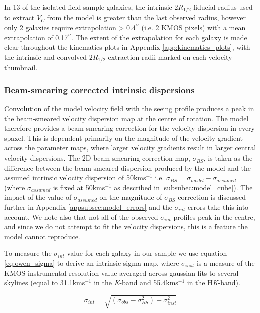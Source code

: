\documentclass[fleqn,usenatbib]{mn2e}
\begin{document}
In 13 of the isolated field sample galaxies, the intrinsic $2R_{1/2}$ fiducial radius used to extract $V_{C}$ from the model is greater than the last observed radius, however only 2 galaxies require extrapolation > 0.4$^{\prime\prime}$ (i.e. 2 KMOS pixels) with a mean extrapolation of 0.17$^{\prime\prime}$.
The extent of the extrapolation for each galaxy is made clear throughout the kinematics plots in Appendix \ref{app:kinematics_plots}, with the intrinsic and convolved $2R_{1/2}$ extraction radii marked on each velocity thumbnail.

\subsubsection{Beam-smearing corrected intrinsic dispersions}\label{subsubsec:beam_smearing_corrected_dispersions}
Convolution of the model velocity field with the seeing profile produces a peak in the beam-smeared velocity dispersion map at the centre of rotation.
The model therefore provides a beam-smearing correction for the velocity dispersion in every spaxel.
This is dependent primarily on the magnitude of the velocity gradient across the parameter maps, where larger velocity gradients result in larger central velocity dispersions.
The 2D beam-smearing correction map, $\sigma_{BS}$, is taken as the difference between the beam-smeared dispersion produced by the model and the assumed intrinsic velocity dispersion of 50kms$^{-1}$ i.e. $\sigma_{BS} = \sigma_{model} - \sigma_{assumed}$ (where $\sigma_{assumed}$ is fixed at 50kms$^{-1}$ as described in \cref{subsubec:model_cube}).
The impact of the value of $\sigma_{assumed}$ on the magnitude of $\sigma_{BS}$ correction is discussed further in Appendix \ref{appsubsec:model_errors} and the $\sigma_{int}$ errors take this into account.
We note also that not all of the observed $\sigma_{int}$ profiles peak in the centre, and since we do not attempt to fit the velocity dispersions, this is a feature the model cannot reproduce. 

To measure the $\sigma_{int}$ value for each galaxy in our sample we use equation \ref{eq:owen_sigma} to derive an intrinsic sigma map, where $\sigma_{inst}$ is a measure of the KMOS instrumental resolution value averaged across gaussian fits to several skylines (equal to 31.1kms$^{-1}$ in the {\it K}-band and 55.4kms$^{-1}$ in the H{\it K}-band).

\begin{equation}\label{eq:owen_sigma}
\sigma_{int} = \sqrt{\left(\sigma_{obs} - \sigma_{BS}^{2}\right) - \sigma_{inst}^{2}}
\end{equation}
\end{document}
